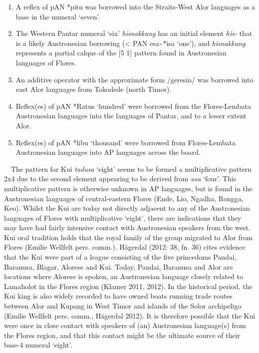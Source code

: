 \begin{enumerate}
\item A reflex of pAN *pitu was borrowed into the Straits-West Alor languages as a base in the numeral {\textquoteleft}seven{\textquoteright}. 
\item The Western Pantar numeral {\textquoteleft}six{\textquoteright} \textit{hisnakkung} has an initial element \textit{his-} that is a likely Austronesian borrowing ({\textless} PAN esa\~{}*isa {\textquoteleft}one{\textquoteright}), and \textit{hisnakkung }represents a partial calque of the [5 1] pattern found in Austronesian languages of Flores. 
\item An additive operator with the approximate form /geresin/ was borrowed into east Alor languages from Tokodede (north Timor). 
\item Reflex(es) of pAN *Ratus {\textquoteleft}hundred{\textquoteright} were borrowed from the Flores-Lembata Austronesian languages into the languages of Pantar, and to a lesser extent Alor.
\item Reflex(es) of pAN *libu {\textquoteleft}thousand{\textquoteright} were borrowed from Flores-Lembata Austronesian languages into AP languages across the board.  
\end{enumerate}
\ \ The pattern for Kui \textit{tadusa }{\textquoteleft}eight{\textquoteright} seems to be formed a multiplicative pattern 2x4 due to the second element appearing to be derived from \textit{usa }{\textquoteleft}four{\textquoteright}. This multiplicative pattern is otherwise unknown in AP languages, but is found in the Austronesian languages of central-eastern Flores (Ende, Lio, Ngadha, Rongga, Keo). Whilst the Kui are today not directly adjacent to any of the Austronesian languages of Flores with multiplicative {\textquoteleft}eight{\textquoteright}, there are indications that they may have had fairly intensive contact with Austronesian speakers from the west. Kui oral tradition holds that the royal family of the group migrated to Alor from Flores (Emilie Wellfelt pers. comm.). H\"agerdal (2012: 38, fn. 36) cites evidence that the Kui were part of a league consisting of the five princedoms Pandai, Baranusa, Blagar, Alorese and Kui. Today, Pandai, Baranusa and Alor are locations where Alorese is spoken, an 
Austronesian language closely related to Lamaholot in the Flores region (Klamer 2011, 2012). In the historical period, the Kui king is also widely recorded to have owned boats running trade routes between Alor and Kupang in West Timor and islands of the Solor archipeligo (Emilie Wellfelt pers. comm., H\"agerdal 2012). It is therefore possible that the Kui were once in close contact with speakers of (an) Austronesian language(s) from the Flores region, and that this contact might be the ultimate source of their base-4 numeral {\textquoteleft}eight{\textquoteright}.

